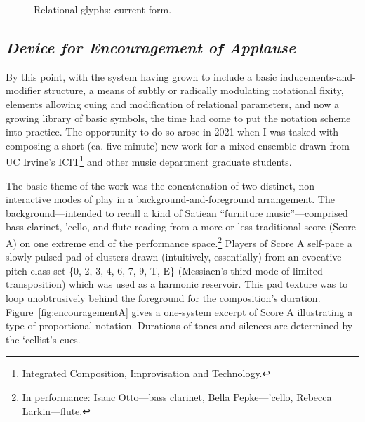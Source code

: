         \begin{figure}
            \centering
            \captionsetup{width=.5\textwidth} 
            \caption{Relational glyphs: current form.}
            \label{fig:relational2}
        \end{figure}



    \subsection{\textit{Device for Encouragement of Applause}}

    By this point, with the system having grown to include a basic inducements-and-modifier structure, a means of subtly or radically modulating notational fixity, elements allowing cuing and modification of relational parameters, and now a growing library of basic symbols, the time had come to put the notation scheme into practice. The opportunity to do so arose in 2021 when I was tasked with composing a short (ca. five minute) new work for a mixed ensemble drawn from UC Irvine's ICIT\footnote{Integrated Composition, Improvisation and Technology.} and other music department graduate students.

    The basic theme of the work was the concatenation of two distinct, non-interactive modes of play in a background-and-foreground arrangement. The background---intended to recall a kind of Satiean ``furniture music''---comprised bass clarinet, 'cello, and flute reading from a more-or-less traditional score (Score A) on one extreme end of the performance space.\footnote{In performance: Isaac Otto---bass clarinet, Bella Pepke---'cello, Rebecca Larkin---flute.} Players of Score A self-pace a slowly-pulsed pad of clusters drawn (intuitively, essentially) from an evocative pitch-class set \{0, 2, 3, 4, 6, 7, 9, T, E\} (Messiaen's third mode of limited transposition) which was used as a harmonic reservoir. This pad texture was to loop unobtrusively behind the foreground for the composition's duration. Figure~\ref{fig:encouragementA} gives a one-system excerpt of Score A illustrating a type of proportional notation. Durations of tones and silences are determined by the `cellist's cues.

